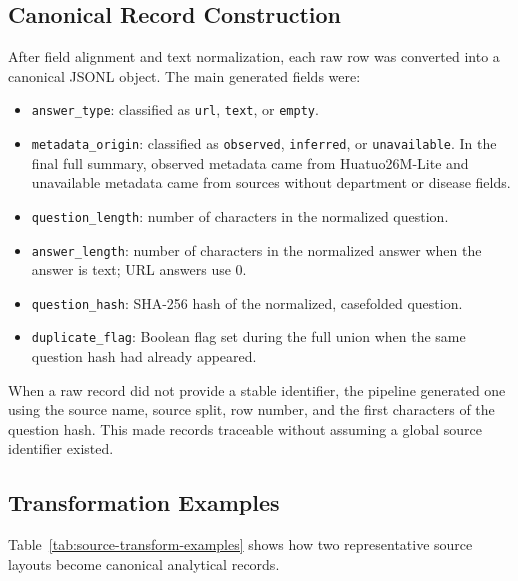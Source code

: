 \documentclass[12pt,a4paper]{article}
\begin{document}
\subsection{Canonical Record Construction}

After field alignment and text normalization, each raw row was converted into a canonical JSONL object. The main generated fields were:

\begin{itemize}
\item \texttt{answer\_type}: classified as \texttt{url}, \texttt{text}, or \texttt{empty}.
\item \texttt{metadata\_origin}: classified as \texttt{observed}, \texttt{inferred}, or \texttt{unavailable}. In the final full summary, observed metadata came from Huatuo26M-Lite and unavailable metadata came from sources without department or disease fields.
\item \texttt{question\_length}: number of characters in the normalized question.
\item \texttt{answer\_length}: number of characters in the normalized answer when the answer is text; URL answers use 0.
\item \texttt{question\_hash}: SHA-256 hash of the normalized, casefolded question.
\item \texttt{duplicate\_flag}: Boolean flag set during the full union when the same question hash had already appeared.
\end{itemize}

When a raw record did not provide a stable identifier, the pipeline generated one using the source name, source split, row number, and the first characters of the question hash. This made records traceable without assuming a global source identifier existed.

\subsection{Transformation Examples}

Table~\ref{tab:source-transform-examples} shows how two representative source layouts become canonical analytical records.
\end{document}
